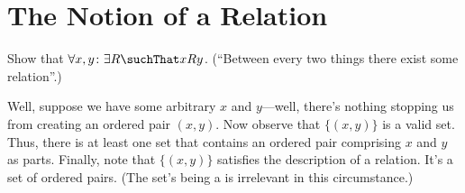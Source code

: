 \section{The Notion of a Relation}

\begin{Exercise} [number=13]
  Show that $\forall{x,y} \colon \exists{R} \suchThat xRy$. (``Between
  every two things there exist some relation''.)
\end{Exercise}

\begin{Answer}
  Well, suppose we have some arbitrary $x$ and $y$---well, there's
  nothing stopping us from creating an ordered pair $(x,y)$. Now
  observe that $\{(x,y)\}$ is a valid set. Thus, there is at least one
  set that contains an ordered pair comprising $x$ and $y$ as
  parts. Finally, note that $\{(x,y)\}$ satisfies the description of a
  relation. It's a set of ordered pairs. (The set's being a 
  is irrelevant in this circumstance.)
\end{Answer}
